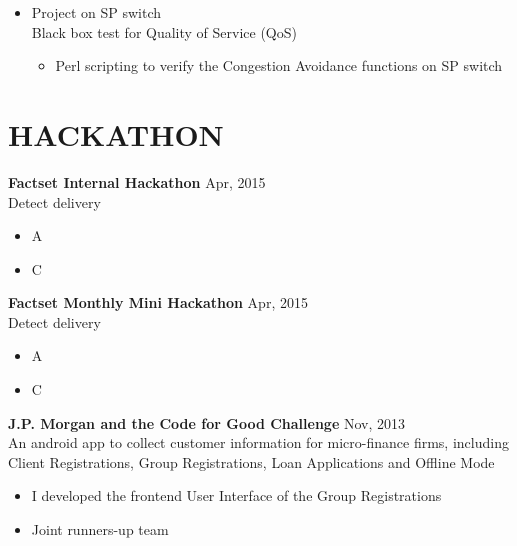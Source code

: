 \documentclass[line,margin]{res}
\begin{document}
\begin{resume}
\begin{itemize}
    \item Project on SP switch\\
    Black box test for Quality of Service (QoS)\vspace{-6pt}
    \begin{itemize}\itemsep -2pt %
        \item Perl scripting to verify the Congestion Avoidance functions on SP switch
    \end{itemize}

\end{itemize}

\section{HACKATHON} 
\renewcommand{\labelitemi}{-}

{\bf Factset Internal Hackathon}
\hfill{\textcolor[rgb]{0.7,0.7,0.7}{Apr, 2015}}\\
Detect delivery
\begin{itemize}\itemsep -2pt %
    \item A
    \item C
\end{itemize}

{\bf Factset Monthly Mini Hackathon}
\hfill{\textcolor[rgb]{0.7,0.7,0.7}{Apr, 2015}}\\
Detect delivery
\begin{itemize}\itemsep -2pt %
    \item A
    \item C
\end{itemize}

{\bf J.P. Morgan and the Code for Good Challenge}
\hfill{\textcolor[rgb]{0.7,0.7,0.7}{Nov, 2013}}\\
An android app to collect customer information for micro-finance firms, including Client Registrations, Group Registrations, Loan Applications and Offline Mode
\begin{itemize}\itemsep -2pt %
    \item I developed the frontend User Interface of the Group Registrations
    \item Joint runners-up team
\end{itemize}


\end{resume}
\end{document}
